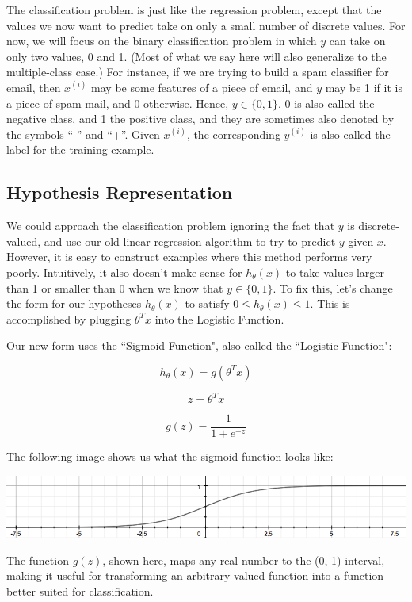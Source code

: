 \documentclass[UTF8]{article}
\begin{document}
The classification problem is just like the regression problem, except that the values we now want to predict take on only a small number of discrete values. For now, we will focus on the binary classification problem in which $y$ can take on only two values, 0 and 1. (Most of what we say here will also generalize to the multiple-class case.) For instance, if we are trying to build a spam classifier for email, then $x^{(i)}$ may be some features of a piece of email, and $y$ may be 1 if it is a piece of spam mail, and 0 otherwise. Hence, $y\in\{0,1\}$. 0 is also called the negative class, and 1 the positive class, and they are sometimes also denoted by the symbols ``-'' and ``+''. Given $x^{(i)}$, the corresponding $y^{(i)}$ is also called the label for the training example.

\subsection{Hypothesis Representation}

We could approach the classification problem ignoring the fact that $y$ is discrete-valued, and use our old linear regression algorithm to try to predict $y$ given $x$. However, it is easy to construct examples where this method performs very poorly. Intuitively, it also doesn't make sense for $h_\theta(x)$ to take values larger than 1 or smaller than 0 when we know that $y\in\{0, 1\}$. To fix this, let's change the form for our hypotheses $h_\theta(x)$ to satisfy $0\le h_\theta(x) \le 1$. This is accomplished by plugging $\theta^Tx$ into the Logistic Function.

Our new form uses the ``Sigmoid Function", also called the ``Logistic Function":

\[ h_\theta (x) = g ( \theta^T x )\] 

\[z = \theta^T x \]

\[g(z) = \dfrac{1}{1 + e^{-z}} \]

The following image shows us what the sigmoid function looks like:

\includegraphics[width = \textwidth]{NotePics/6_2_1.png}

The function $g(z)$, shown here, maps any real number to the (0, 1) interval, making it useful for transforming an arbitrary-valued function into a function better suited for classification.
\end{document}
